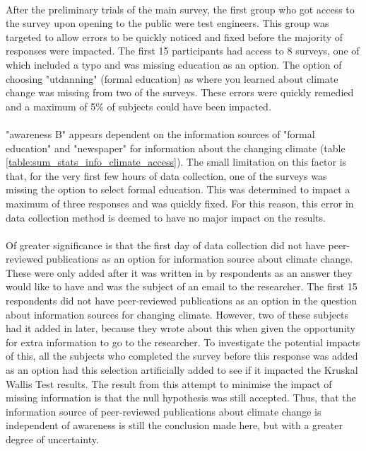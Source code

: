 \paragraph{}
After the preliminary trials of the main survey, the first group who got access to the survey upon opening to the public were test engineers. This group was targeted to allow errors to be quickly noticed and fixed before the majority of responses were impacted. The first 15 participants had access to 8 surveys, one of which included a typo and was missing education as an option. The option of choosing "utdanning" (formal education) as where you learned about climate change was missing from two of the surveys. These errors were quickly remedied and a maximum of 5\% of subjects could have been impacted. 
\paragraph{}
"awareness B" appears dependent on the information sources of "formal education" and "newspaper" for information about the changing climate (table \ref{table:sum_stats_info_climate_access}). The small limitation on this factor is that, for the very first few hours of data collection, one of the surveys was missing the option to select formal education. This was determined to impact a maximum of three responses and was quickly fixed. For this reason, this error in data collection method is deemed to have no major impact on the results. 
\paragraph{}
Of greater significance is that the first day of data collection did not have peer-reviewed publications as an option for information source about climate change. These were only added after it was written in by respondents as an answer they would like to have and was the subject of an email to the researcher.  The first 15 respondents did not have peer-reviewed publications as an option in the question about information sources for changing climate. However, two of these subjects had it added in later, because they wrote about this when given the opportunity for extra information to go to the researcher. To investigate the potential impacts of this, all the subjects who completed the survey before this response was added as an option had this selection artificially added to see if it impacted the Kruskal Wallis Test results. The result from this attempt to minimise the impact of missing information is that the null hypothesis was still accepted. Thus, that the information source of peer-reviewed publications about climate change is independent of awareness is still the conclusion made here, but with a greater degree of uncertainty.
